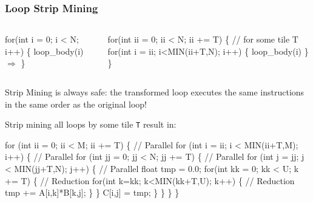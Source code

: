 \documentclass{beamer}
\renewcommand{\emph}[1]{\textcolor{CosGreen}{ #1}}
\newcommand{\emp}[1]{\textcolor{DikuRed}{ #1}}
\newcommand{\emphh}[1]{\textcolor{CosGreen}{ #1}}
\newcommand{\mymath}[1]{$ #1 $}
\begin{document}
\begin{frame}[fragile,t]
  \frametitle{Loop Strip Mining}

\begin{columns}
\begin{colorcode}[fontsize=\scriptsize]
for(int i = 0; i < N; i++) \{
    loop_body(i)             \emp{\mymath{\Rightarrow}}
\}


\end{colorcode}
\begin{colorcode}[fontsize=\scriptsize]
for(int ii = 0; ii < N; ii += T) \{        \alert{// for some tile T}
  for(int i = ii; i<MIN(ii+T,N); i++) \{ 
    loop_body(i)
\}  \}
\end{colorcode}
\end{columns}

\emph{Strip Mining is always safe:} the transformed loop executes
the same instructions in the same order as the original loop!
\bigskip

Strip mining all loops by some tile {\tt T} result in:\pause\smallskip

\begin{colorcode}[fontsize=\scriptsize]
for (int ii = 0; ii < M; ii += T) \{            \emphh{// Parallel}
  for (int i = ii; i < MIN(ii+T,M); i++) \{     \emphh{// Parallel}
    for (int jj = 0; jj < N; jj += T) \{        \emphh{// Parallel}
      for (int j = jj; j < MIN(jj+T,N); j++) \{ \emphh{// Parallel}
          float tmp = 0.0;
          for(int kk = 0; kk < U; k += T) \{    \emp{// Reduction}
            for(int k=kk; k<MIN(kk+T,U); k++) \{\emp{// Reduction}
                tmp += A[i,k]*B[k,j];
            \}
          \}
          C[i,j] = tmp;          
      \}
    \}
  \}
\}
\end{colorcode}
\end{frame}
\end{document}
